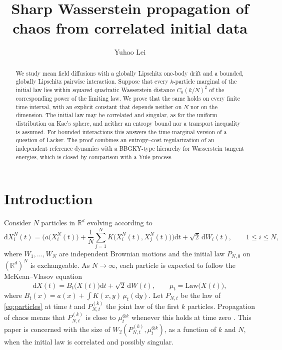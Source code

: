 \documentclass[11pt]{amsart}
\numberwithin{equation}{section}
\theoremstyle{plain}
\theoremstyle{remark}
\newcommand{\R}{\mathbb{R}}
\newcommand{\W}{W_2}
\newcommand{\Law}{\mathrm{Law}}
\newcommand{\dd}{\mathrm{d}}
\begin{document}
\title{Sharp Wasserstein propagation of chaos from correlated initial data}

\author{Yuhao Lei}
\address{Department of Mathematical Sciences, Carnegie Mellon University, Pittsburgh, PA 15213, USA}


\begin{abstract}
We study mean field diffusions with a globally Lipschitz one-body drift and a bounded, globally Lipschitz pairwise interaction. Suppose that every $k$-particle marginal of the initial law lies within squared quadratic Wasserstein distance $C_0(k/N)^2$ of the corresponding power of the limiting law. We prove that the same holds on every finite time interval, with an explicit constant that depends neither on $N$ nor on the dimension. The initial law may be correlated and singular, as for the uniform distribution on Kac's sphere, and neither an entropy bound nor a transport inequality is assumed. For bounded interactions this answers the time-marginal version of a question of Lacker. The proof combines an entropy--cost regularization of an independent reference dynamics with a BBGKY-type hierarchy for Wasserstein tangent energies, which is closed by comparison with a Yule process.
\end{abstract}

\maketitle

\section{Introduction}

Consider $N$ particles in $\R^d$ evolving according to
\begin{equation}\label{eq:particles}
\dd X^N_i(t)=\Big(a\big(X^N_i(t)\big)+\frac1N\sum_{j=1}^N K\big(X^N_i(t),X^N_j(t)\big)\Big)\dd t+\sqrt2\,\dd W_i(t),\qquad 1\le i\le N,
\end{equation}
where $W_1,\dots,W_N$ are independent Brownian motions and the initial law $P_{N,0}$ on $(\R^d)^N$ is exchangeable. As $N\to\infty$, each particle is expected to follow the McKean--Vlasov equation
\begin{equation}\label{eq:MV}
\dd X(t)=B_t\big(X(t)\big)\dd t+\sqrt2\,\dd W(t),\qquad \mu_t=\Law\big(X(t)\big),
\end{equation}
where $B_t(x)=a(x)+\int K(x,y)\,\mu_t(\dd y)$. Let $P_{N,t}$ be the law of \eqref{eq:particles} at time $t$ and $P^{(k)}_{N,t}$ the joint law of the first $k$ particles. Propagation of chaos means that $P^{(k)}_{N,t}$ is close to $\mu_t^{\otimes k}$ whenever this holds at time zero \cite{Kac56,McK66,Gar88,Szn91}. This paper is concerned with the size of $\W(P^{(k)}_{N,t},\mu_t^{\otimes k})$, as a function of $k$ and $N$, when the initial law is correlated and possibly singular.
\end{document}

